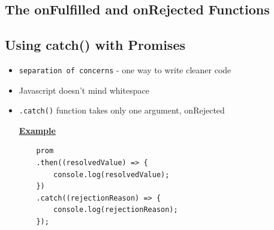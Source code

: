 \documentclass[12pt]{article}
\begin{document}
\subsection{The onFulfilled and onRejected Functions}

\subsection{Using catch() with Promises}
\begin{itemize}
    \item \texttt{separation of concerns} - one way to write cleaner code
    \item Javascript doesn't mind whitespace
    \item \texttt{.catch()} function takes only one argument, onRejected

    \bigskip

    \underline{\textbf{Example}}

    \begin{lstlisting}
    prom
    .then((resolvedValue) => {
        console.log(resolvedValue);
    })
    .catch((rejectionReason) => {
        console.log(rejectionReason);
    });
    \end{lstlisting}

\end{itemize}
\end{document}
